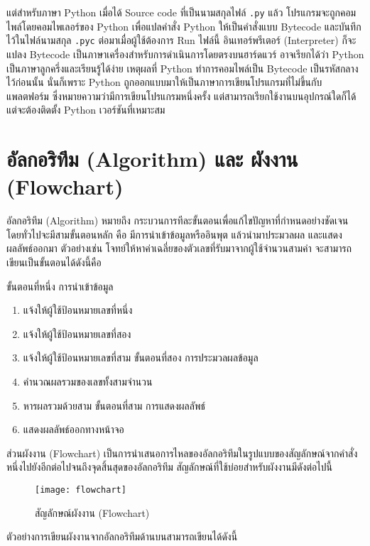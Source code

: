 แต่สำหรับภาษา Python เมื่อได้ Source code ที่เป็นนามสกุลไฟล์ \texttt{.py} แล้ว โปรแกรมจะถูกคอมไพล์โดยคอมไพเลอร์ของ Python เพื่อแปลคำสั่ง Python ให้เป็นคำสั่งแบบ Bytecode และบันทึกไว้ในไฟล์นามสกุล \texttt{.pyc} ต่อมาเมื่อผู้ใช้ต้องการ Run ไฟล์นี้ อินเทอร์พรีเตอร์ (Interpreter) ก็จะแปลง Bytecode เป็นภาษาเครื่องสำหรับการดำเนินการโดยตรงบนฮาร์ดแวร์ \cite{Bea13} อาจเรียกได้ว่า Python เป็นภาษาลูกครึ่งและเรียนรู้ได้ง่าย เหตุผลที่ Python ทำการคอมไพล์เป็น Bytecode เป็นรหัสกลางไว้ก่อนนั้น นั่นก็เพราะ Python ถูกออกแบบมาให้เป็นภาษาการเขียนโปรแกรมที่ไม่ขึ้นกับแพลตฟอร์ม ซึ่งหมายความว่ามีการเขียนโปรแกรมหนึ่งครั้ง แต่สามารถเรียกใช้งานบนอุปกรณ์ใดก็ได้ แต่จะต้องติดตั้ง Python เวอร์ชันที่เหมาะสม 

\section{อัลกอริทึม (Algorithm) และ ผังงาน (Flowchart)}

อัลกอริทึม (Algorithm) หมายถึง กระบวนการทีละขั้นตอนเพื่อแก้ไขปัญหาที่กำหนดอย่างชัดเจน โดยทั่วไปจะมีสามขั้นตอนหลัก คือ มีการนำเข้าข้อมูลหรืออินพุต แล้วนำมาประมวลผล และแสดงผลลัพธ์ออกมา \cite{Ari19} ตัวอย่างเช่น โจทย์ให้หาค่าเฉลี่ยของตัวเลขที่รับมาจากผู้ใช้จำนวนสามค่า จะสามารถเขียนเป็นขั้นตอนได้ดังนี้คือ

ขั้นตอนที่หนึ่ง การนำเข้าข้อมูล
\begin{enumerate}[noitemsep]
\item แจ้งให้ผู้ใช้ป้อนหมายเลขที่หนึ่ง
\item แจ้งให้ผู้ใช้ป้อนหมายเลขที่สอง
\item แจ้งให้ผู้ใช้ป้อนหมายเลขที่สาม
ขั้นตอนที่สอง การประมวลผลข้อมูล
\item คำนวณผลรวมของเลขทั้งสามจำนวน
\item หารผลรวมด้วยสาม
ขั้นตอนที่สาม การแสดงผลลัพธ์
\item แสดงผลลัพธ์ออกทางหน้าจอ
\end{enumerate}

ส่วนผังงาน (Flowchart) เป็นการนำเสนอการไหลของอัลกอริทึมในรูปแบบของสัญลักษณ์จากคำสั่งหนึ่งไปยังอีกต่อไปจนถึงจุดสิ้นสุดของอัลกอริทึม \cite{Cor09} สัญลักษณ์ที่ใช้บ่อยสำหรับผังงานมีดังต่อไปนี้


\begin{figure}[h]
\caption{สัญลักษณ์ผังงาน (Flowchart)}
\texttt{[image: flowchart]}
\centering
\end{figure}

ตัวอย่างการเขียนผังงานจากอัลกอริทึมด้านบนสามารถเขียนได้ดังนี้


